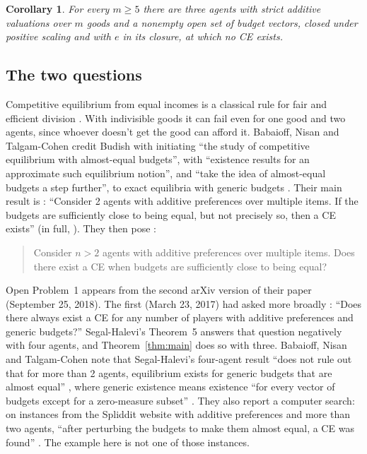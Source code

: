 \documentclass[11pt]{article}
\newtheorem{corollary}[theorem]{Corollary}
\theoremstyle{definition}
\theoremstyle{remark}
\begin{document}
\begin{corollary}\label{cor:m}
For every $m\ge5$ there are three agents with strict additive valuations
over $m$ goods and a nonempty open set of budget vectors, closed under
positive scaling and with $e$ in its closure, at which no CE exists.
\end{corollary}

\subsection{The two questions}
Competitive equilibrium from equal incomes is a classical rule for fair
and efficient division \cite{Fol,Var}. With indivisible goods it can fail
even for one good and two agents, since whoever doesn't get the good can
afford it. Babaioff, Nisan and Talgam-Cohen credit Budish \cite{Bud} with initiating
``the study of competitive equilibrium with almost-equal budgets'', with
``existence results for an approximate such equilibrium notion'', and
``take the idea of almost-equal budgets a step further'', to exact
equilibria with generic budgets \cite[Section~1]{BNT}.
Their main result is \cite[Theorem~1.1]{BNT}: ``Consider 2 agents with
additive preferences over multiple items. If the budgets are sufficiently
close to being equal, but not precisely so, then a CE exists'' (in full,
\cite[Theorem~7.1]{BNT}). They then pose \cite[Open Problem~1]{BNT}:
\begin{quote}
Consider $n>2$ agents with additive preferences over multiple items. Does
there exist a CE when budgets are sufficiently close to being equal?
\end{quote}
Open Problem~1 appears from the second arXiv version of their paper
(September 25, 2018). The first (March 23, 2017) had asked more broadly
\cite[Section~1.4]{BNT1}: ``Does there always exist a CE for any number of players with
additive preferences and generic budgets?'' Segal-Halevi's Theorem~5 \cite{SH}
answers that question negatively with four agents, and
Theorem~\ref{thm:main} does so with three. Babaioff, Nisan and
Talgam-Cohen note that Segal-Halevi's four-agent result ``does not rule
out that for more than 2 agents, equilibrium exists for generic budgets
that are almost equal'' \cite[Section~1]{BNT}, where generic existence
means existence ``for every vector of budgets except for a zero-measure
subset'' \cite[Section~2.2.2]{BNT}. They also report a computer search: on
instances from the Spliddit website with additive preferences and more
than two agents, ``after perturbing the budgets to make them almost
equal, a CE was found'' \cite[Section~9.2 and Appendix~B.2]{BNT}. The
example here is not one of those instances.
\end{document}
